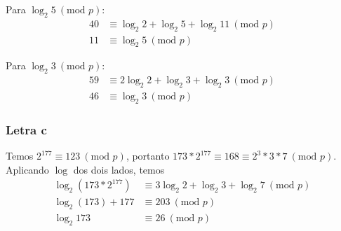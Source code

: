 \documentclass{article}
\renewcommand{\mod}[1]{ \ (\textrm{mod } #1) }
\begin{document}
Para $\log_2 5 \mod{p}$:
\begin{align*}
    40 &\equiv \log_2 2 + \log_2 5 + \log_2 11 \mod{p} \\
    11 &\equiv \log_2 5 \mod{p}
\end{align*}

Para $\log_2 3 \mod{p}$:
\begin{align*}
    59 &\equiv 2\log_2 2 + \log_2 3 + \log_2 3 \mod{p} \\
    46 &\equiv \log_2 3 \mod{p}
\end{align*}

\subsubsection{Letra c}

Temos $2^{177} \equiv 123 \mod{p}$,
portanto $173*2^{177} \equiv 168 \equiv 2^3*3*7 \mod{p}$.
Aplicando $\log$ dos dois lados, temos
\begin{align*}
    \log_2(173*2^{177}) &\equiv 3\log_2 2 + \log_2 3 + \log_2 7 \mod{p} \\
    \log_2(173) + 177 &\equiv 203 \mod{p} \\
    \log_2 173 &\equiv 26 \mod{p}
\end{align*}
\end{document}
